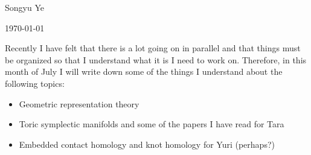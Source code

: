 \documentclass[12pt]{article}
\begin{document}
Songyu Ye

\today

Recently I have felt that there is a lot going on in parallel and that things must be organized
so that I understand what it is I need to work on. Therefore, in this month of July I will write down 
some of the things I understand about the following topics:

\begin{itemize}
    \item Geometric representation theory
    \item Toric symplectic manifolds and some of the papers I have read for Tara
    \item Embedded contact homology and knot homology for Yuri (perhaps?)
\end{itemize}
\end{document}
